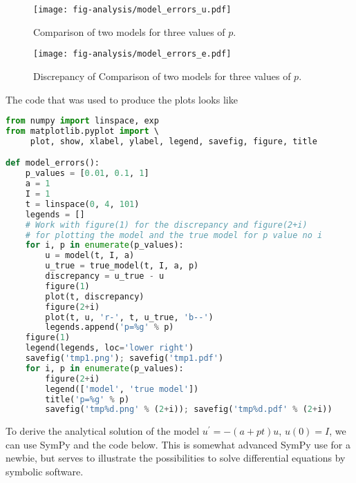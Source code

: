 \documentclass[graybox,sectrefs,envcountresetchap,open=right,final]{svmonodo}
\begin{document}
\begin{figure}[!ht]  %
  \centerline{\texttt{[image: fig-analysis/model\_errors\_u.pdf]}}
  \caption{
  Comparison of two models for three values of $p$. \label{decay:analysis:model_errors:fig:model_u}
  }
\end{figure}



\begin{figure}[!ht]  %
  \centerline{\texttt{[image: fig-analysis/model\_errors\_e.pdf]}}
  \caption{
  Discrepancy of Comparison of two models for three values of $p$. \label{decay:analysis:model_errors:fig:model_e}
  }
\end{figure}


The code that was used to produce the plots looks like

\begin{lstlisting}[language=Python,style=blue1_bluegreen]
from numpy import linspace, exp
from matplotlib.pyplot import \ 
     plot, show, xlabel, ylabel, legend, savefig, figure, title

def model_errors():
    p_values = [0.01, 0.1, 1]
    a = 1
    I = 1
    t = linspace(0, 4, 101)
    legends = []
    # Work with figure(1) for the discrepancy and figure(2+i)
    # for plotting the model and the true model for p value no i
    for i, p in enumerate(p_values):
        u = model(t, I, a)
        u_true = true_model(t, I, a, p)
        discrepancy = u_true - u
        figure(1)
        plot(t, discrepancy)
        figure(2+i)
        plot(t, u, 'r-', t, u_true, 'b--')
        legends.append('p=%g' % p)
    figure(1)
    legend(legends, loc='lower right')
    savefig('tmp1.png'); savefig('tmp1.pdf')
    for i, p in enumerate(p_values):
        figure(2+i)
        legend(['model', 'true model'])
        title('p=%g' % p)
        savefig('tmp%d.png' % (2+i)); savefig('tmp%d.pdf' % (2+i))
\end{lstlisting}

To derive the analytical solution of the model $u^{\prime}=-(a+pt)u$, $
u(0)=I$, we can use SymPy and the code below. This is somewhat advanced
SymPy use for a newbie, but serves to illustrate the possibilities to
solve differential equations by symbolic software.
\end{document}
